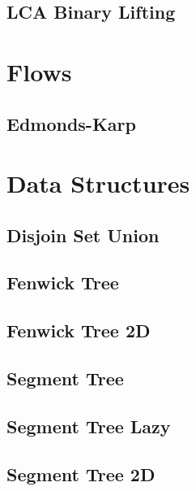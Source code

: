 \subsection{LCA Binary Lifting}
\raggedbottom
\hrulefill

\section{Flows}
\subsection{Edmonds-Karp}
\raggedbottom
\hrulefill

\section{Data Structures}
\subsection{Disjoin Set Union}
\raggedbottom
\hrulefill
\subsection{Fenwick Tree}
\raggedbottom
\hrulefill
\subsection{Fenwick Tree 2D}
\raggedbottom
\hrulefill
\subsection{Segment Tree}
\raggedbottom
\hrulefill
\subsection{Segment Tree Lazy}
\raggedbottom
\hrulefill
\subsection{Segment Tree 2D}
\raggedbottom
\hrulefill
